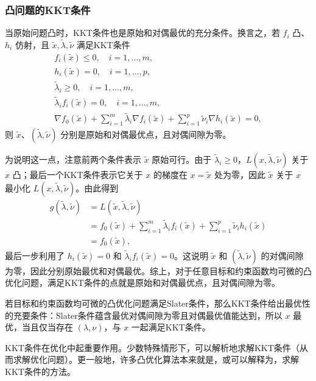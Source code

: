 \subsubsection*{凸问题的KKT条件}
当原始问题凸时，KKT条件也是原始和对偶最优的充分条件。换言之，若 $f_i$ 凸、$h_i$ 仿射，且 $\widetilde x,\widetilde\lambda,\widetilde\nu$ 满足KKT条件
\[
\begin{gathered}
f_i(\widetilde x)\le0,\quad i=1,\ldots,m,\\
h_i(\widetilde x)=0,\quad i=1,\ldots,p,\\
\widetilde\lambda_i\ge0,\quad i=1,\ldots,m,\\
\widetilde\lambda_i f_i(\widetilde x)=0,\quad i=1,\ldots,m,\\
\nabla f_0(\widetilde x)+\sum_{i=1}^m\widetilde\lambda_i\nabla f_i(\widetilde x)
+\sum_{i=1}^p\widetilde\nu_i\nabla h_i(\widetilde x)=0,
\end{gathered}
\]
则 $\widetilde x$、$(\widetilde\lambda,\widetilde\nu)$ 分别是原始和对偶最优点，且对偶间隙为零。

为说明这一点，注意前两个条件表示 $\widetilde x$ 原始可行。由于 $\widetilde\lambda_i\ge0$，$L(x,\widetilde\lambda,\widetilde\nu)$ 关于 $x$ 凸；最后一个KKT条件表示它关于 $x$ 的梯度在 $x=\widetilde x$ 处为零，因此 $\widetilde x$ 关于 $x$ 最小化 $L(x,\widetilde\lambda,\widetilde\nu)$。由此得到
\[
\begin{aligned}
g(\widetilde\lambda,\widetilde\nu)&=L(\widetilde x,\widetilde\lambda,\widetilde\nu)\\
&=f_0(\widetilde x)+\sum_{i=1}^m\widetilde\lambda_i f_i(\widetilde x)
+\sum_{i=1}^p\widetilde\nu_i h_i(\widetilde x)\\
&=f_0(\widetilde x),
\end{aligned}
\]
最后一步利用了 $h_i(\widetilde x)=0$ 和 $\widetilde\lambda_i f_i(\widetilde x)=0$。这说明 $\widetilde x$ 和 $(\widetilde\lambda,\widetilde\nu)$ 的对偶间隙为零，因此分别原始最优和对偶最优。综上，对于任意目标和约束函数均可微的凸优化问题，满足KKT条件的点就是原始和对偶最优点，且对偶间隙为零。

若目标和约束函数均可微的凸优化问题满足Slater条件，那么KKT条件给出最优性的充要条件：Slater条件蕴含最优对偶间隙为零且对偶最优值能达到，所以 $x$ 最优，当且仅当存在 $(\lambda,\nu)$，与 $x$ 一起满足KKT条件。

KKT条件在优化中起重要作用。少数特殊情形下，可以解析地求解KKT条件（从而求解优化问题）。更一般地，许多凸优化算法本来就是，或可以解释为，求解KKT条件的方法。

